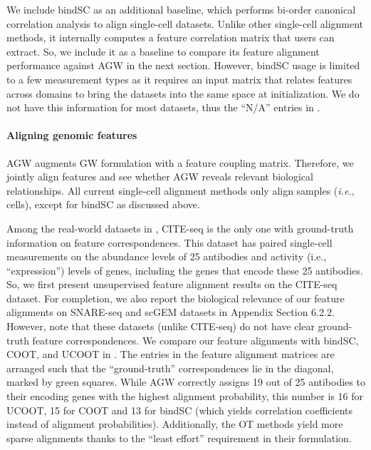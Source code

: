 We include bindSC as an additional baseline, which performs bi-order canonical correlation analysis
to align single-cell datasets. Unlike other single-cell alignment methods,
it internally computes a feature correlation matrix that users can extract. So,
we include it as a baseline to compare its feature alignment performance against
AGW in the next section. However, bindSC usage is limited to a few measurement types
as it requires an input matrix that relates features across domains to bring the datasets
into the same space at initialization. We do not have this information for most datasets,
thus the ``N/A'' entries in .


\paragraph{Aligning genomic features} AGW augments GW formulation with a feature coupling matrix.
Therefore, we jointly align features and see whether AGW reveals relevant biological relationships.
All current single-cell alignment methods only align samples (\textit{i.e.}, cells),
except for bindSC as discussed above.

Among the real-world datasets in , CITE-seq \citep{CITEseq}
is the only one with ground-truth information on feature correspondences.
This dataset has paired single-cell measurements on the abundance levels of
25 antibodies and activity (i.e., ``expression'') levels of genes,
including the genes that encode these 25 antibodies. So, we first present
unsupervised feature alignment results on the CITE-seq dataset. For completion,
we also report the biological relevance of our feature alignments on SNARE-seq \citep{SNAREseq}
and scGEM \citep{scGEM} datasets in Appendix Section 6.2.2. However, note that
these datasets (unlike CITE-seq) do not have clear ground-truth feature correspondences.
We compare our feature alignments with bindSC, COOT, and UCOOT in .
The entries in the feature alignment matrices are arranged such that
the ``ground-truth'' correspondences lie in the diagonal, marked by green squares.
While AGW correctly assigns 19 out of 25 antibodies to their encoding genes with
the highest alignment probability, this number is 16 for UCOOT, 15 for COOT and
13 for bindSC (which yields correlation coefficients instead of alignment probabilities).
Additionally, the OT methods yield more sparse alignments thanks to
the ``least effort'' requirement in their formulation.

